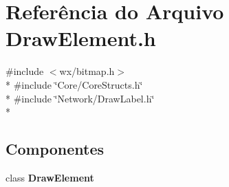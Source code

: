 \section{Referência do Arquivo Draw\+Element.\+h}
\label{_draw_element_8h}
{\ttfamily \#include $<$wx/bitmap.\+h$>$}\\*
{\ttfamily \#include \char`\"{}Core/\+Core\+Structs.\+h\char`\"{}}\\*
{\ttfamily \#include \char`\"{}Network/\+Draw\+Label.\+h\char`\"{}}\\*
\subsection*{Componentes}
\begin{DoxyCompactItemize}
\item 
class {\bf Draw\+Element}
\end{DoxyCompactItemize}
